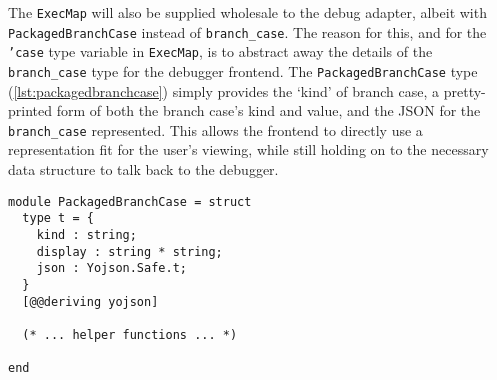The \texttt{ExecMap} will also be supplied wholesale to the debug adapter,
albeit with \texttt{PackagedBranchCase} instead of \texttt{branch\_case}.
The reason for this, and for the \texttt{'case} type variable in
\texttt{ExecMap}, is to abstract away the details of the \texttt{branch\_case}
type for the debugger frontend. The \texttt{PackagedBranchCase} type
(\autoref{lst:packagedbranchcase}) simply provides the `kind' of branch case,
a pretty-printed form of both the branch case's kind and value, and the JSON
for the \texttt{branch\_case} represented. This allows the frontend to directly
use a representation fit for the user's viewing, while still holding on to the
necessary data structure to talk back to the debugger.

\begin{lstlisting}[caption={
  The \texttt{PackagedBranchCase} type, inside the \texttt{Debugger} module
  \label{lst:packagedbranchcase}}, style=code, numbers=none]
module PackagedBranchCase = struct
  type t = {
    kind : string;
    display : string * string;
    json : Yojson.Safe.t;
  }
  [@@deriving yojson]

  (* ... helper functions ... *)

end
\end{lstlisting}
